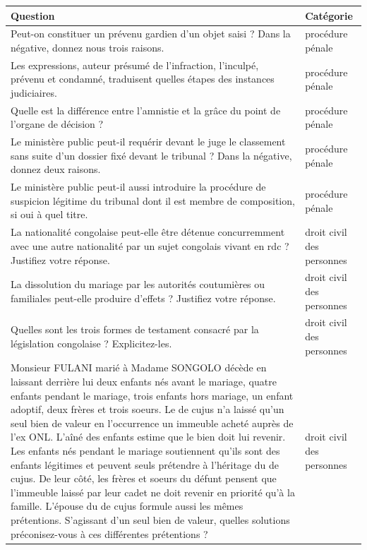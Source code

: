 \begin{longtable}{|p{}|p{}|}
\hline
\textbf{Question} & \textbf{Catégorie} \\
\hline
Peut-on constituer un prévenu gardien d'un objet saisi ? Dans la négative, donnez nous trois raisons. & procédure pénale \\
\hline
Les expressions, auteur présumé de l'infraction, l'inculpé, prévenu et condamné, traduisent quelles étapes des instances judiciaires. & procédure pénale \\
\hline
Quelle est la différence entre l'amnistie et la grâce du point de l'organe de décision ? & procédure pénale \\
\hline
Le ministère public peut-il requérir devant le juge le classement sans suite d'un dossier fixé devant le tribunal ? Dans la négative, donnez deux raisons. & procédure pénale \\
\hline
Le ministère public peut-il aussi introduire la procédure de suspicion légitime du tribunal dont il est membre de composition, si oui à quel titre. & procédure pénale \\
\hline
La nationalité congolaise peut-elle être détenue concurremment avec une autre nationalité par un sujet congolais vivant en \ac{rdc} ? Justifiez votre réponse. & droit civil des personnes \\
\hline
La dissolution du mariage par les autorités coutumières ou familiales peut-elle produire d'effets ? Justifiez votre réponse. & droit civil des personnes \\
\hline
Quelles sont les trois formes de testament consacré par la législation congolaise ? Explicitez-les. & droit civil des personnes \\
\hline
Monsieur FULANI marié à Madame SONGOLO décède en laissant derrière lui deux enfants nés avant le mariage, quatre enfants pendant le mariage, trois enfants hors mariage, un enfant adoptif, deux frères et trois soeurs. Le de cujus n'a laissé qu'un seul bien de valeur en l'occurrence un immeuble acheté auprès de l'ex ONL. L'aîné des enfants estime que le bien doit lui revenir. Les enfants nés pendant le mariage soutiennent qu'ils sont des enfants légitimes et peuvent seuls prétendre à l'héritage du de cujus. De leur côté, les frères et soeurs du défunt pensent que l'immeuble laissé par leur cadet ne doit revenir en priorité qu'à la famille. L'épouse du de cujus formule aussi les mêmes prétentions. S'agissant d'un seul bien de valeur, quelles solutions préconisez-vous à ces différentes prétentions ? & droit civil des personnes \\

\end{longtable}
